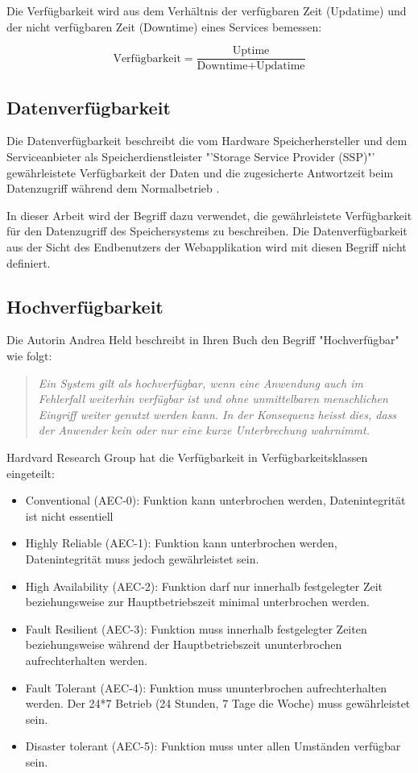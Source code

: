 Die Verfügbarkeit wird aus dem Verhältnis der verfügbaren Zeit (Updatime) und der nicht verfügbaren Zeit (Downtime) eines Services \cite{Held2004} bemessen:

\begin{equation}
\mbox{Verfügbarkeit} = \frac{\mbox{Uptime}}{ \mbox{Downtime} + \mbox{Updatime} }
\label{eqn:Verfügbarkeit}
\end{equation}

\subsection{Datenverfügbarkeit}
Die Datenverfügbarkeit beschreibt die vom Hardware Speicherhersteller und dem Serviceanbieter als Speicherdienstleister "'Storage Service Provider (SSP)"'  gewährleistete Verfügbarkeit der Daten und die zugesicherte Antwortzeit beim Datenzugriff während dem Normalbetrieb \cite{TechTarget2001}.

In dieser Arbeit wird der Begriff dazu verwendet, die gewährleistete Verfügbarkeit für den Datenzugriff des Speichersystems zu beschreiben. Die Datenverfügbarkeit aus der Sicht des Endbenutzers der Webapplikation wird mit diesen Begriff nicht definiert. 

\subsection{Hochverfügbarkeit}
Die Autorin Andrea Held beschreibt in Ihren Buch den Begriff "Hochverfügbar" wie folgt:
\begin{quotation}\em
Ein System gilt als hochverfügbar, wenn eine Anwendung auch im Fehlerfall weiterhin verfügbar ist und ohne unmittelbaren menschlichen Eingriff weiter genutzt werden kann. In der Konsequenz heisst dies, dass der Anwender kein oder nur eine kurze Unterbrechung wahrnimmt.\end{quotation}\cite{Held2004}

Hardvard Research Group hat die Verfügbarkeit in Verfügbarkeitsklassen eingeteilt:

\begin{itemize}
\item Conventional (AEC-0): Funktion kann unterbrochen werden, Datenintegrität ist nicht essentiell
\item Highly Reliable (AEC-1): Funktion kann unterbrochen werden, Datenintegrität muss jedoch gewährleistet sein.
\item High Availability (AEC-2): Funktion darf nur innerhalb festgelegter Zeit beziehungsweise zur Hauptbetriebszeit minimal unterbrochen werden.
\item Fault Resilient (AEC-3): Funktion muss innerhalb festgelegter Zeiten beziehungsweise während der Hauptbetriebszeit ununterbrochen aufrechterhalten werden.
\item Fault Tolerant (AEC-4): Funktion muss ununterbrochen aufrechterhalten werden. Der 24*7 Betrieb (24 Stunden, 7 Tage die Woche) muss gewährleistet sein.
\item Disaster tolerant (AEC-5): Funktion muss unter allen Umständen verfügbar sein.
\end{itemize}
\cite{Held2004}

